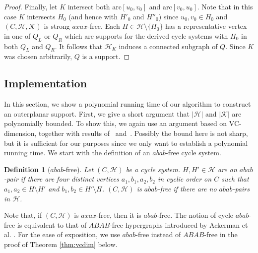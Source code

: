 \documentclass[12pt]{article}
\newcommand{\HH}{\mathcal{H}}
\newcommand{\KK}{\mathcal{K}}
\newcommand{\arc}{\mathrm{arc}}
\newtheorem{definition}[theorem]{Definition}
\theoremstyle{case}
\begin{document}
\begin{proof}
Finally, let $K$ intersect both $\arc[u_0,v_0]$ and $\arc[v_0,u_0]$.
Note that in this case $K$ intersects $H_0$ (and hence with $H'_0$ and $H''_0$) since $u_0,v_0\in H_0$ and $(C,\HH,\KK)$ is strong $axax$-free.
Each $H\in\HH\setminus\{H_0\}$ has a representative vertex in one of $Q_L$ or $Q_R$ which are supports for the derived cycle systems with $H_0$ in both $Q_L$ and $Q_R$.
It follows that $\HH_K$ induces a connected subgraph of $Q$.
Since $K$ was chosen arbitrarily, $Q$ is a support.
\end{proof}

\subsection{Implementation}\label{sec:implementation}
In this section, we show a polynomial running time of our algorithm to construct an outerplanar support.
First, we give a short
argument that $|\mathcal{H}|$ and $|\mathcal{K}|$ are polynomially bounded.
To show this, we again use an argument based on VC-dimension, together with results of~\cite{ackerman2020coloring} and~\cite{RR18}.
Possibly the bound here is not sharp, but it is sufficient for our purposes since we only want to establish a polynomial running time.
We start with the definition of an $abab$-free cycle system.

\begin{definition}[$abab$-free]
\label{defn:abab}
Let $(C,\mathcal{H})$ be a cycle system.
$H,H'\in\mathcal{H}$ are an $abab$-pair if there are four distinct vertices 
$a_1,b_1,a_2,b_2$ in cyclic order on $C$ such that $a_1,a_2\in H\setminus H'$ and $b_1,b_2\in H'\setminus H$.
$(C,\mathcal{H})$ is $abab$-free if there are no $abab$-pairs in $\mathcal{H}$.
\end{definition}

Note that, if $(C,\HH)$ is $axax$-free, then it is $abab$-free.
The notion of cycle $abab$-free is equivalent to that of $ABAB$-free hypergraphs introduced by Ackerman et al. \cite{ackerman2020coloring}.
For the ease of exposition, we use $abab$-free instead of $ABAB$-free in the proof of Theorem \ref{thm:vcdim} below.
\end{document}
